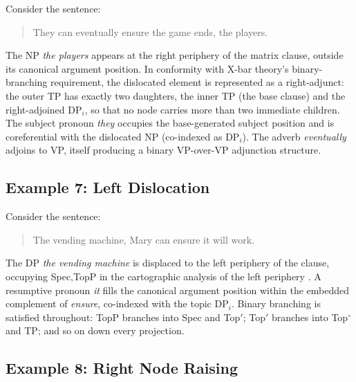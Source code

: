 \documentclass[letterpaper]{article}
\begin{document}
\begin{example}
Consider the sentence:
\begin{quote}
  They can eventually ensure the game ends, the players.
\end{quote}
The NP \emph{the players} appears at the right periphery of the matrix clause,
outside its canonical argument position.
In conformity with X-bar theory's binary-branching requirement,
the dislocated element is represented as a right-adjunct:
the outer TP has exactly two daughters, the inner TP (the base clause)
and the right-adjoined $\mathrm{DP}_i$, so that no node carries more
than two immediate children.
The subject pronoun \emph{they} occupies the base-generated subject position
and is coreferential with the dislocated NP (co-indexed as $\mathrm{DP}_i$).
The adverb \emph{eventually} adjoins to VP, itself producing a binary VP-over-VP
adjunction structure.
\end{example}
 
 
\subsection{Example 7: Left Dislocation}
 
\begin{example}
Consider the sentence:
\begin{quote}
  The vending machine, Mary can ensure it will work.
\end{quote}
The DP \emph{the vending machine} is displaced to the left periphery of the clause,
occupying Spec,TopP in the cartographic analysis of the left periphery
\cite{rizzi1997fine}. A resumptive pronoun \emph{it} fills the canonical argument
position within the embedded complement of \emph{ensure}, co-indexed
with the topic $\mathrm{DP}_i$. Binary branching is satisfied throughout:
TopP branches into Spec and Top$'$; Top$'$ branches into Top$^\circ$ and TP;
and so on down every projection.
\end{example}
 
 
\subsection{Example 8: Right Node Raising}
 
\end{document}
